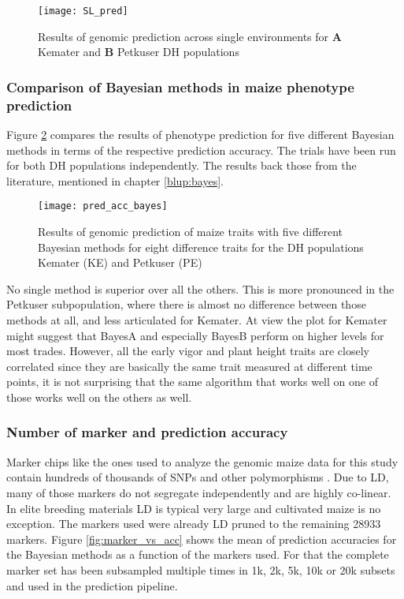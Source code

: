 \begin{figure}[H]
 \centering \texttt{[image: SL\_pred]}
 \decoRule
 \caption[Results of genomic prediction across single environments for Kemater and
 Petkuser DH populations]{Results of genomic prediction across single environments for
   \textbf{A} Kemater and \textbf{B} Petkuser DH populations}
\label{fig:sl_pred}
\end{figure}

\subsubsection{Comparison of Bayesian methods in maize phenotype prediction}

Figure \ref{fig:bayes_vs_acc} compares the results of phenotype prediction for five
different Bayesian methods in terms of the respective prediction accuracy. The trials have
been run for both DH populations independently. The results back those from the
literature, mentioned in chapter \ref{blup:bayes}.

\begin{figure}[H]
 \centering \texttt{[image: pred\_acc\_bayes]}
 \decoRule
 \caption[Results of genomic prediction of maize traits with five different Bayesian
 methods]{Results of genomic prediction of maize traits with five different Bayesian
   methods for eight difference traits for the DH populations Kemater (KE) and Petkuser
   (PE)}
\label{fig:bayes_vs_acc}
\end{figure}

No single method is superior over all the others. This is more pronounced in the Petkuser
subpopulation, where there is almost no difference between those methods at all, and less
articulated for Kemater. At view the plot for Kemater might suggest that BayesA and
especially BayesB perform on higher levels for most trades. However, all the early vigor
and plant height traits are closely correlated since they are basically the same trait
measured at different time points, it is not surprising that the same algorithm that works
well on one of those works well on the others as well.

\subsubsection{Number of marker and prediction accuracy}

Marker chips like the ones used to analyze the genomic maize data for this study contain
hundreds of thousands of SNPs and other polymorphisms \cite{unterseer2014powerful}. Due to
LD, many of those markers do not segregate independently and are highly co-linear. In
elite breeding materials LD is typical very large and cultivated maize is no
exception. The markers used were already LD pruned to the remaining 28933 markers. Figure
\ref{fig:marker_vs_acc} shows the mean of prediction accuracies for the Bayesian methods
as a function of the markers used. For that the complete marker set has been subsampled
multiple times in 1k, 2k, 5k, 10k or 20k subsets and used in the prediction pipeline.

